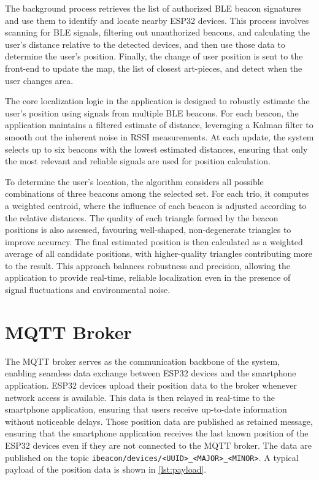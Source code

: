 The background process retrieves the list of authorized BLE beacon signatures and use them to identify and locate nearby ESP32 devices. This process involves scanning for BLE signals, filtering out unauthorized beacons, and calculating the user’s distance relative to the detected devices, and then use those data to determine the user's position. Finally, the change of user position is sent to the front-end to update the map, the list of closest art-pieces, and detect when the user changes area.

The core localization logic in the application is designed to robustly estimate the user's position using signals from multiple BLE beacons. For each beacon, the application maintains a filtered estimate of distance, leveraging a Kalman filter to smooth out the inherent noise in RSSI measurements. At each update, the system selects up to six beacons with the lowest estimated distances, ensuring that only the most relevant and reliable signals are used for position calculation.

To determine the user's location, the algorithm considers all possible combinations of three beacons among the selected set. For each trio, it computes a weighted centroid, where the influence of each beacon is adjusted according to the relative distances. The quality of each triangle formed by the beacon positions is also assessed, favouring well-shaped, non-degenerate triangles to improve accuracy. The final estimated position is then calculated as a weighted average of all candidate positions, with higher-quality triangles contributing more to the result. This approach balances robustness and precision, allowing the application to provide real-time, reliable localization even in the presence of signal fluctuations and environmental noise.

\section{MQTT Broker}
	The MQTT broker serves as the communication backbone of the system, enabling seamless data exchange between ESP32 devices and the smartphone application. ESP32 devices upload their position data to the broker whenever network access is available. This data is then relayed in real-time to the smartphone application, ensuring that users receive up-to-date information without noticeable delays. Those position data are published as retained message, ensuring that the smartphone application receives the last known position of the ESP32 devices even if they are not connected to the MQTT broker. The data are published on the topic \texttt{ibeacon/devices/<UUID>\_<MAJOR>\_<MINOR>}. A typical payload of the position data is shown in \autoref{lst:payload}.

